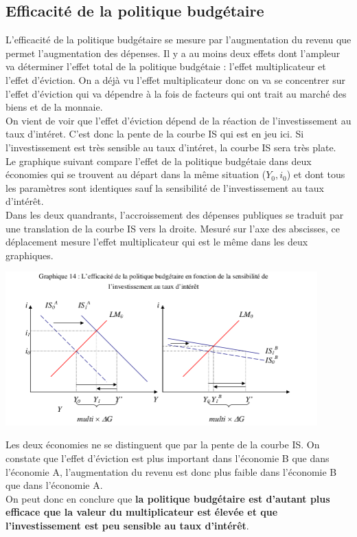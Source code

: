 \documentclass[10pt]{book}
\begin{document}
\subsection{Efficacité de la politique budgétaire}
L'efficacité de la politique budgétaire se mesure par l'augmentation du revenu que permet l'augmentation des dépenses. Il y a au moins deux effets dont l'ampleur va déterminer l'effet total de la politique budgétaie : l'effet multiplicateur et l'effet d'éviction. On a déjà vu l'effet multiplicateur donc on va se concentrer sur l'effet d'éviction qui va dépendre à la fois de facteurs qui ont trait au marché des biens et de la monnaie. \\
On vient de voir que l'effet d'éviction dépend de la réaction de l'investissement au taux d'intéret. C'est donc la pente de la courbe IS qui est en jeu ici. Si l'investissement est très sensible au taux d'intéret, la courbe IS sera très plate. \\
Le graphique suivant compare l'effet de la politique budgétaie dans deux économies qui se trouvent au départ dans la même situation ($Y_0, i_0$) et dont tous les paramètres sont identiques sauf la sensibilité de l'investissement au taux d'intérêt. \\
Dans les deux quandrants, l'accroissement des dépenses publiques se traduit par une translation de la courbe IS vers la droite. Mesuré sur l'axe des abscisses, ce déplacement mesure l'effet multiplicateur qui est le même dans les deux graphiques.
\begin{center}
  \includegraphics[width=12cm]{graph39.png}
\end{center}
Les deux économies ne se distinguent que par la pente de la courbe IS. On constate que l'effet d'éviction est plus important dans l'économie B que dans l'économie A, l'augmentation du revenu est donc plus faible dans l'économie B que dans l'économie A. \\
On peut donc en conclure que \textbf{la politique budgétaire est d'autant plus efficace que la valeur du multiplicateur est élevée et que l'investissement est peu sensible au taux d'intérêt}. \\
\end{document}
